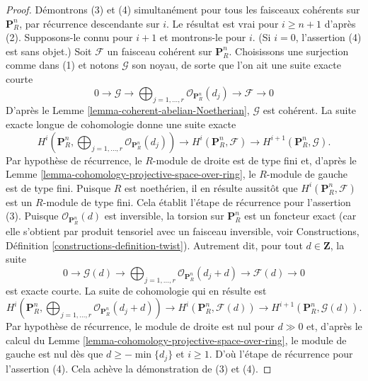 \begin{proof}
\medskip\noindent
Démontrons (3) et (4) simultanément pour tous les faisceaux cohérents
sur $\mathbf{P}^n_R$, par récurrence descendante sur $i$. Le résultat
est vrai pour $i \geq n + 1$ d'après (2). Supposons-le connu pour
$i + 1$ et montrons-le pour $i$. (Si $i = 0$,
l'assertion (4) est sans objet.) Soit $\mathcal{F}$ un faisceau cohérent sur
$\mathbf{P}^n_R$. Choisissons une surjection comme dans (1) et notons
$\mathcal{G}$ son noyau, de sorte que l'on ait une suite exacte courte
$$
0 \to \mathcal{G} \to
\bigoplus\nolimits_{j = 1, \ldots, r}
\mathcal{O}_{\mathbf{P}^n_R}(d_j)
\to
\mathcal{F} \to 0
$$
D'après le Lemme \ref{lemma-coherent-abelian-Noetherian},
$\mathcal{G}$ est cohérent. La suite exacte longue
de cohomologie donne une suite exacte
$$
H^i(\mathbf{P}^n_R, \bigoplus\nolimits_{j = 1, \ldots, r}
\mathcal{O}_{\mathbf{P}^n_R}(d_j))
\to
H^i(\mathbf{P}^n_R, \mathcal{F})
\to
H^{i + 1}(\mathbf{P}^n_R, \mathcal{G}).
$$
Par hypothèse de récurrence, le $R$-module de droite est de type fini et, d'après le
Lemme \ref{lemma-cohomology-projective-space-over-ring}, le
$R$-module de gauche est de type fini. Puisque $R$ est noethérien, il en résulte aussitôt
que $H^i(\mathbf{P}^n_R, \mathcal{F})$ est un $R$-module de type fini.
Cela établit l'étape de récurrence pour l'assertion (3).
Puisque $\mathcal{O}_{\mathbf{P}^n_R}(d)$ est inversible,
la torsion sur $\mathbf{P}^n_R$ est un foncteur exact (car
elle s'obtient par produit tensoriel avec un faisceau inversible, voir
Constructions, Définition \ref{constructions-definition-twist}).
Autrement dit, pour tout $d \in \mathbf{Z}$, la suite
$$
0 \to \mathcal{G}(d) \to
\bigoplus\nolimits_{j = 1, \ldots, r}
\mathcal{O}_{\mathbf{P}^n_R}(d_j + d)
\to
\mathcal{F}(d) \to 0
$$
est exacte courte. La suite de cohomologie qui en résulte est
$$
H^i(\mathbf{P}^n_R, \bigoplus\nolimits_{j = 1, \ldots, r}
\mathcal{O}_{\mathbf{P}^n_R}(d_j + d))
\to
H^i(\mathbf{P}^n_R, \mathcal{F}(d))
\to
H^{i + 1}(\mathbf{P}^n_R, \mathcal{G}(d)).
$$
Par hypothèse de récurrence, le module de droite est nul
pour $d \gg 0$ et, d'après le calcul du
Lemme \ref{lemma-cohomology-projective-space-over-ring},
le module de gauche est nul dès que $d \geq -\min\{d_j\}$
et $i \geq 1$. D'où l'étape de récurrence pour l'assertion (4).
Cela achève la démonstration de (3) et (4).


\end{proof}

